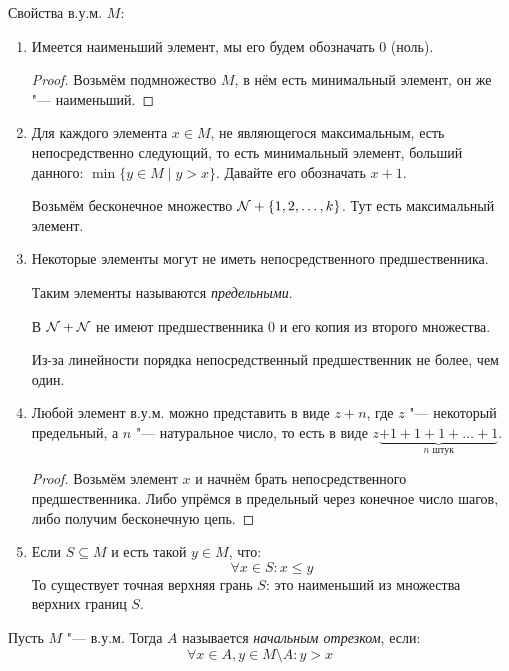 Свойства в.у.м. $M$:
\begin{enumerate}
	\item
		Имеется наименьший элемент, мы его будем обозначать $0$ (ноль).
		\begin{proof}
			Возьмём подмножество $M$, в нём есть минимальный элемент, он же "--- наименьший.
		\end{proof}
	\item
		Для каждого элемента $x\in M$, не являющегося максимальным, есть непосредственно следующий, то есть
		минимальный элемент, больший данного: $\min \{ y \in M \mid y > x\}$.
		Давайте его обозначать $x+1$.
		\begin{exmp}
			Возьмём бесконечное множество $\mathcal{N} + \{ 1, 2, \dots, k \}$.
			Тут есть максимальный элемент.
		\end{exmp}
	\item
		Некоторые элементы могут не иметь непосредственного предшественника.
		\begin{Def}
			Таким элементы называются \textit{предельными}.
		\end{Def}
		\begin{exmp}
			В $\mathcal{N} + \mathcal{N}$ не имеют предшественника $0$ и его копия из второго множества.
		\end{exmp}
		\begin{Rem}
			Из-за линейности порядка непосредственный предшественник не более, чем один.
		\end{Rem}
	\item
		Любой элемент в.у.м. можно представить в виде $z+n$, где $z$ "--- некоторый предельный,
		а $n$ "--- натуральное число, то есть в виде $z\underbrace{+1+1+1+\dots+1}_{n\text{~штук}}$.
		\begin{proof}
			Возьмём элемент $x$ и начнём брать непосредственного предшественника.
			Либо упрёмся в предельный через конечное число шагов, либо получим бесконечную цепь.
		\end{proof}
	\item
		Если $S \subseteq M$ и есть такой $y \in M$, что:
		\[ \forall x \in S \colon x \le y \]
		То существует точная верхняя грань $S$: это наименьший из множества верхних границ $S$.
\end{enumerate}

\begin{Def}
	Пусть $M$ "--- в.у.м.
	Тогда $A$ называется \textit{начальным отрезком}, если:
	\[ \forall x \in A, y \in M \setminus A \colon y > x \]
\end{Def}
